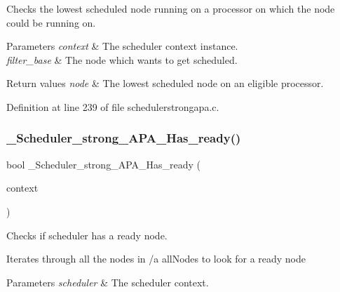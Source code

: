 Checks the lowest scheduled node running on a processor on which the  node could be running on. 


\begin{DoxyParams}{Parameters}
{\em context} & The scheduler context instance. \\
\hline
{\em filter\+\_\+base} & The node which wants to get scheduled.\\
\hline
\end{DoxyParams}

\begin{DoxyRetVals}{Return values}
{\em node} & The lowest scheduled node on an eligible processor. \\
\hline
\end{DoxyRetVals}


Definition at line 239 of file schedulerstrongapa.\+c.

\mbox{\label{group__RTEMSScoreSchedulerStrongAPA_ga1eb39ec8e5e7663e5696db912ddf01ba}} 
\subsubsection{\texorpdfstring{\+\_\+\+Scheduler\+\_\+strong\+\_\+\+A\+P\+A\+\_\+\+Has\+\_\+ready()}{\_Scheduler\_strong\_APA\_Has\_ready()}}
{\footnotesize\ttfamily bool \+\_\+\+Scheduler\+\_\+strong\+\_\+\+A\+P\+A\+\_\+\+Has\+\_\+ready (\begin{DoxyParamCaption}\item[{Scheduler\+\_\+\+Context $\ast$}]{context }\end{DoxyParamCaption})}



Checks if scheduler has a ready node. 

Iterates through all the nodes in /a all\+Nodes to look for a ready node


\begin{DoxyParams}{Parameters}
{\em scheduler} & The scheduler context. \\
\hline
\end{DoxyParams}

